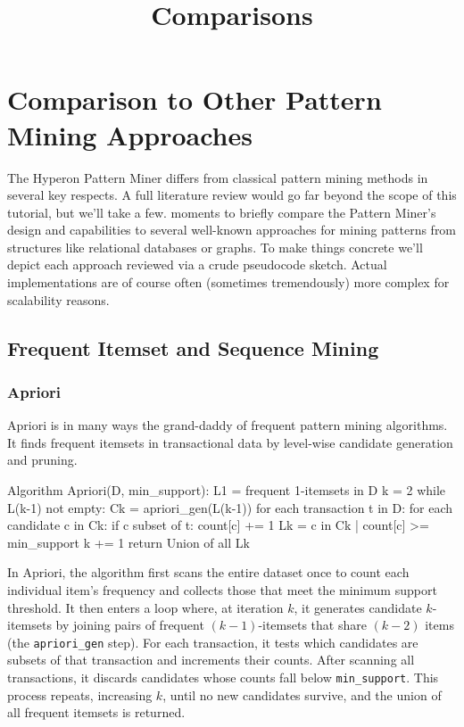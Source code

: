 \documentclass{article}
\title{Comparisons}
\begin{document}
\section{Comparison to Other Pattern Mining Approaches}

The Hyperon Pattern Miner differs from classical pattern mining methods in several key respects.   A full literature review would go far beyond the scope of this tutorial, but we'll take a few. moments to briefly compare the Pattern Miner's design and capabilities to several well-known approaches for mining patterns from structures like relational databases or graphs.   To make things concrete we'll depict each approach reviewed via a crude pseudocode sketch.  Actual implementations are of course often (sometimes tremendously) more complex for scalability reasons.


\subsection{Frequent Itemset and Sequence Mining}
\subsubsection{Apriori}

Apriori \cite{agrawal1994fast} is in many ways the grand-daddy of frequent pattern mining algorithms.  It finds frequent itemsets in transactional data by level-wise candidate generation and pruning.

\begin{algpseudocode}
Algorithm Apriori(D, min_support):
    L1 = { frequent 1-itemsets in D }
    k = 2
    while L(k-1) not empty:
        Ck = apriori_gen(L(k-1))
        for each transaction t in D:
            for each candidate c in Ck:
                if c subset of t:
                    count[c] += 1
        Lk = { c in Ck | count[c] >= min_support }
        k += 1
    return Union of all Lk
\end{algpseudocode}

In Apriori, the algorithm first scans the entire dataset once to count each individual item's frequency and collects those that meet the minimum support threshold.  It then enters a loop where, at iteration $k$, it generates candidate $k$-itemsets by joining pairs of frequent $(k-1)$-itemsets that share $(k-2)$ items (the \texttt{apriori\_gen} step).  For each transaction, it tests which candidates are subsets of that transaction and increments their counts.  After scanning all transactions, it discards candidates whose counts fall below \texttt{min\_support}.  This process repeats, increasing $k$, until no new candidates survive, and the union of all frequent itemsets is returned.
\end{document}
